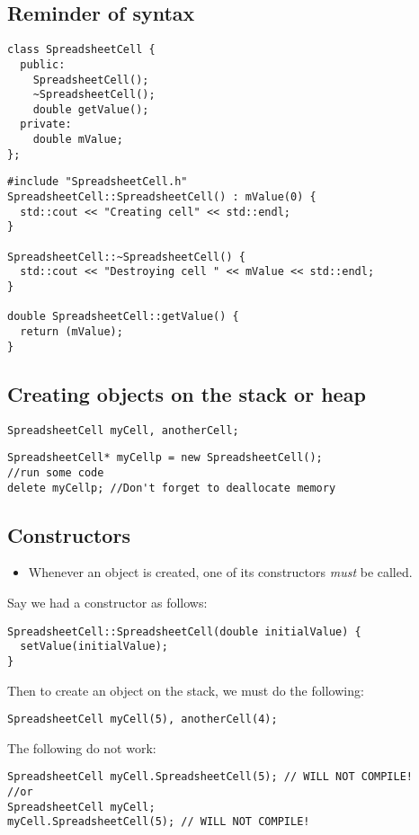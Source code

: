 \documentclass[a4paper,12pt]{article}
\begin{document}
\subsection{Reminder of syntax}
\begin{lstlisting}[caption={SpreadsheetCell.h}]
class SpreadsheetCell {
  public:
    SpreadsheetCell();
    ~SpreadsheetCell();
    double getValue();
  private:
    double mValue;
};
\end{lstlisting}
\begin{lstlisting}[caption={SpreadsheetCell.cpp}]
#include "SpreadsheetCell.h"
SpreadsheetCell::SpreadsheetCell() : mValue(0) {
  std::cout << "Creating cell" << std::endl;
}

SpreadsheetCell::~SpreadsheetCell() {
  std::cout << "Destroying cell " << mValue << std::endl;
}

double SpreadsheetCell::getValue() {
  return (mValue);
}
\end{lstlisting}
\subsection{Creating objects on the stack or heap}
\begin{lstlisting}[caption={Creating objects on the stack}]
SpreadsheetCell myCell, anotherCell;
\end{lstlisting}
\begin{lstlisting}[caption={Creating objects on the heap}]
SpreadsheetCell* myCellp = new SpreadsheetCell();
//run some code
delete myCellp; //Don't forget to deallocate memory
\end{lstlisting}

\subsection{Constructors}
\begin{itemize}
  \item Whenever an object is created, one of its constructors \emph{must} be called.
\end{itemize}

Say we had a constructor as follows:
\begin{lstlisting}
SpreadsheetCell::SpreadsheetCell(double initialValue) {
  setValue(initialValue);
}
\end{lstlisting}
Then to create an object on the stack, we must do the following:
\begin{lstlisting}
SpreadsheetCell myCell(5), anotherCell(4);
\end{lstlisting}
The following do not work:
\begin{lstlisting}
SpreadsheetCell myCell.SpreadsheetCell(5); // WILL NOT COMPILE!
//or
SpreadsheetCell myCell;
myCell.SpreadsheetCell(5); // WILL NOT COMPILE!
\end{lstlisting}
\end{document}
